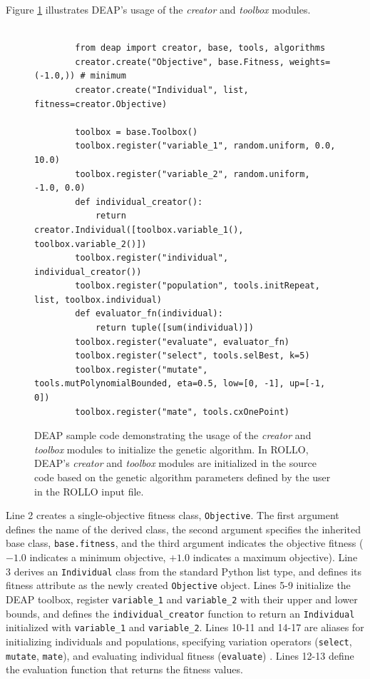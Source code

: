 Figure \ref{fig:deap-code} illustrates \gls{DEAP}'s usage of the \textit{creator} and
\textit{toolbox} modules. 
\begin{figure}[]
    \begin{verbatim}
        
        from deap import creator, base, tools, algorithms
        creator.create("Objective", base.Fitness, weights=(-1.0,)) # minimum
        creator.create("Individual", list, fitness=creator.Objective)

        toolbox = base.Toolbox()
        toolbox.register("variable_1", random.uniform, 0.0, 10.0)
        toolbox.register("variable_2", random.uniform, -1.0, 0.0)
        def individual_creator():
            return creator.Individual([toolbox.variable_1(), toolbox.variable_2()])
        toolbox.register("individual", individual_creator())
        toolbox.register("population", tools.initRepeat, list, toolbox.individual)
        def evaluator_fn(individual):
            return tuple([sum(individual)])
        toolbox.register("evaluate", evaluator_fn)
        toolbox.register("select", tools.selBest, k=5)
        toolbox.register("mutate", tools.mutPolynomialBounded, eta=0.5, low=[0, -1], up=[-1, 0])
        toolbox.register("mate", tools.cxOnePoint)
    \end{verbatim}
    \caption{DEAP sample code demonstrating the usage of the \textit{creator} and
    \textit{toolbox} modules to initialize the genetic algorithm. In \gls{ROLLO}, \gls{DEAP}'s 
    \textit{creator} and \textit{toolbox} modules are initialized in the source 
    code based on the genetic algorithm parameters defined by the user in the 
    \gls{ROLLO} input file. }
    \label{fig:deap-code}
\end{figure}
Line 2 creates a single-objective fitness class, \texttt{Objective}. 
The first argument defines the name of the derived class, the second argument 
specifies the inherited base class, \texttt{base.fitness}, and the third 
argument indicates the objective fitness ($-1.0$ indicates a minimum objective, 
$+1.0$ indicates a maximum objective). 
Line 3 derives an \texttt{Individual} class from the standard Python list type,
and defines its fitness attribute as the newly created \texttt{Objective} object. 
Lines 5-9 initialize the \gls{DEAP} toolbox, register 
\texttt{variable\_1} and \texttt{variable\_2} with their upper and lower bounds, 
and defines the \texttt{individual\_creator} function to return an 
\texttt{Individual} initialized with \texttt{variable\_1} and \texttt{variable\_2}. 
Lines 10-11 and 14-17 are aliases for initializing individuals and populations, 
specifying variation operators (\texttt{select}, \texttt{mutate}, \texttt{mate}), 
and evaluating individual fitness (\texttt{evaluate}) \cite{fortin_deap_2012}. 
Lines 12-13 define the evaluation function that returns the fitness values. 

